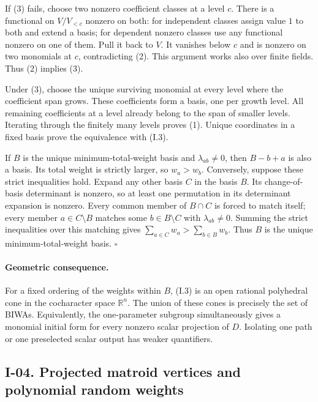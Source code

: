 \documentclass[11pt,a4paper]{article}
\theoremstyle{definition}\newtheorem{definition}{Definition}
\begin{document}
If (3) fails, choose two nonzero coefficient classes at a level $c$.
There is a functional on $V/V_{<c}$ nonzero on both: for independent
classes assign value $1$ to both and extend a basis; for dependent
nonzero classes use any functional nonzero on one of them.  Pull it
back to $V$.  It vanishes below $c$ and is nonzero on two monomials
at $c$, contradicting (2).  This argument works also over finite
fields.  Thus (2) implies (3).

Under (3), choose the unique surviving monomial at every level where
the coefficient span grows.  These coefficients form a basis, one
per growth level.  All remaining coefficients at a level already
belong to the span of smaller levels.  Iterating through the finitely
many levels proves (1).  Unique coordinates in a fixed basis prove
the equivalence with (I.3).

If $B$ is the unique minimum-total-weight basis and
$\lambda_{ab}\ne0$, then $B-b+a$ is also a basis.  Its total weight
is strictly larger, so $w_a>w_b$.  Conversely, suppose these strict
inequalities hold.  Expand any other basis $C$ in the basis $B$.
Its change-of-basis determinant is nonzero, so at least one
permutation in its determinant expansion is nonzero.  Every common
member of $B\cap C$ is forced to match itself; every member
$a\in C\setminus B$ matches some $b\in B\setminus C$ with
$\lambda_{ab}\ne0$.  Summing the strict inequalities over this
matching gives $\sum_{a\in C}w_a>\sum_{b\in B}w_b$.
Thus $B$ is the unique minimum-total-weight basis. \hfill$\square$

\paragraph{Geometric consequence.}
For a fixed ordering of the weights within $B$, (I.3) is an open
rational polyhedral cone in the cocharacter space $\mathbb R^n$.
The union of these cones is precisely the set of BIWAs.  Equivalently,
the one-parameter subgroup simultaneously gives a monomial initial
form for every nonzero scalar projection of $D$.  Isolating one path
or one preselected scalar output has weaker quantifiers.

\subsection{I-04. Projected matroid vertices and polynomial random weights}
\label{I-04}
\end{document}

